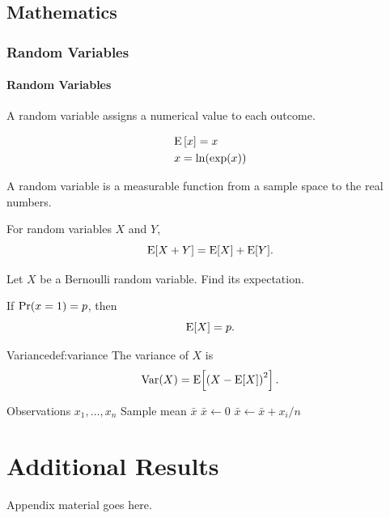 \documentclass[11pt,a4paper]{book}
\begin{document}
\section{Mathematics}

\subsection{Random Variables}

\subsubsection{Random Variables}

A random variable assigns a numerical value to each outcome.

\begin{equation}
  \begin{aligned}
    & \mathrm{E}\bracket{x} = x \\
    & x = \ln\paren{\exp\paren{x}}
  \end{aligned}
\end{equation}

\begin{definition}
A random variable is a measurable function from a sample space
to the real numbers.
\end{definition}

\begin{theorem}
For random variables \(X\) and \(Y\),
\[
  \mathrm{E}[X+Y]
  =
  \mathrm{E}[X]+\mathrm{E}[Y].
\]
\end{theorem}

\begin{question}[Expectation]
Let \(X\) be a Bernoulli random variable. Find its expectation.
\end{question}

\begin{kaitou}
If $\mathrm{Pr}\paren{x=1} = p$, then
\[
  \mathrm{E}[X]=p.
\]
\end{kaitou}

\begin{defbox}{Variance}{def:variance}
The variance of \(X\) is
\[
  \operatorname{Var}(X)
  =
  \mathrm{E}\!\left[
    \left(X-\mathrm{E}[X]\right)^2
  \right].
\]
\end{defbox}

\begin{algorithm}
  \caption{Calculate the sample mean}
  \begin{algorithmic}
    \AlgInput Observations \(x_1,\dots,x_n\)
    \AlgOutput Sample mean \(\bar{x}\)
    \State \(\bar{x}\gets 0\)
      \State \(\bar{x}\gets\bar{x}+x_i/n\)
    \EndFor
  \end{algorithmic}
\end{algorithm}


\appendix
\chapter{Additional Results}

Appendix material goes here.
\end{document}
